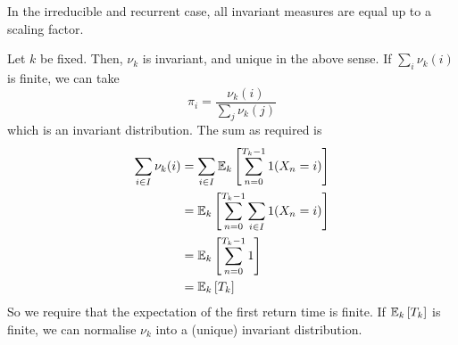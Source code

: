 \begin{remark}
	In the irreducible and recurrent case, all invariant measures are equal up to a scaling factor.
\end{remark}
\noindent Let \( k \) be fixed.
Then, \( \nu_k \) is invariant, and unique in the above sense.
If \( \sum_i \nu_k(i) \) is finite, we can take
\[
	\pi_i = \frac{\nu_k(i)}{\sum_j \nu_k(j)}
\]
which is an invariant distribution.
The sum as required is
\begin{align*}
	\sum_{i \in I} \nu_k(i) & = \sum_{i\in I} \mathbb{E}_{k}\left[{\sum_{n=0}^{T_k - 1} 1(X_n = i)}\right]  \\
	                        & = \mathbb{E}_{k}\left[{\sum_{n=0}^{T_k - 1} \sum_{i \in I} 1(X_n = i)}\right] \\
	                        & = \mathbb{E}_{k}\left[{\sum_{n=0}^{T_k - 1} 1}\right]                         \\
	                        & = \mathbb{E}_{k}\left[{T_k}\right]                                            \\
\end{align*}
So we require that the expectation of the first return time is finite.
If \( \mathbb{E}_{k}\left[{T_k}\right] \) is finite, we can normalise \( \nu_k \) into a (unique) invariant distribution.

